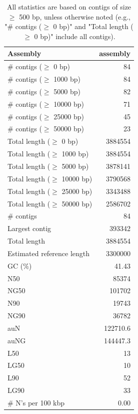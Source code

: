 \documentclass[12pt,a4paper]{article}
\begin{document}
\begin{table}[ht]
\begin{center}
\caption{All statistics are based on contigs of size $\geq$ 500 bp, unless otherwise noted (e.g., "\# contigs ($\geq$ 0 bp)" and "Total length ($\geq$ 0 bp)" include all contigs).}
\begin{tabular}{|l*{1}{|r}|}
\hline
Assembly & assembly \\ \hline
\# contigs ($\geq$ 0 bp) & 84 \\ \hline
\# contigs ($\geq$ 1000 bp) & 84 \\ \hline
\# contigs ($\geq$ 5000 bp) & 82 \\ \hline
\# contigs ($\geq$ 10000 bp) & 71 \\ \hline
\# contigs ($\geq$ 25000 bp) & 45 \\ \hline
\# contigs ($\geq$ 50000 bp) & 23 \\ \hline
Total length ($\geq$ 0 bp) & 3884554 \\ \hline
Total length ($\geq$ 1000 bp) & 3884554 \\ \hline
Total length ($\geq$ 5000 bp) & 3878141 \\ \hline
Total length ($\geq$ 10000 bp) & 3790568 \\ \hline
Total length ($\geq$ 25000 bp) & 3343488 \\ \hline
Total length ($\geq$ 50000 bp) & 2586702 \\ \hline
\# contigs & 84 \\ \hline
Largest contig & 393342 \\ \hline
Total length & 3884554 \\ \hline
Estimated reference length & 3300000 \\ \hline
GC (\%) & 41.43 \\ \hline
N50 & 85374 \\ \hline
NG50 & 101702 \\ \hline
N90 & 19743 \\ \hline
NG90 & 36782 \\ \hline
auN & 122710.6 \\ \hline
auNG & 144447.3 \\ \hline
L50 & 13 \\ \hline
LG50 & 10 \\ \hline
L90 & 52 \\ \hline
LG90 & 33 \\ \hline
\# N's per 100 kbp & 0.00 \\ \hline
\end{tabular}
\end{center}
\end{table}
\end{document}
